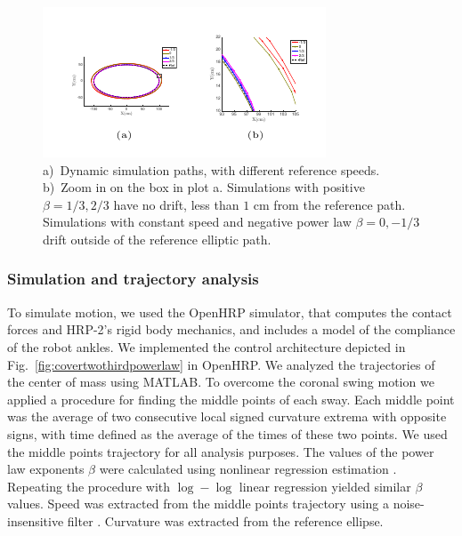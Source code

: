 \begin{figure}
	\centering
	\includegraphics[trim=0cm 0.4cm 0cm 0.5cm,width=\linewidth]{./figures/dynamic_simulation.pdf}
	\caption{a)~Dynamic simulation paths, with different reference speeds. b)~Zoom in on the box in plot a. Simulations with positive $\beta = 1/3,2/3$ have no drift, less than $1$ cm from the reference path. Simulations with constant speed and negative power law $\beta = 0, -1/3$ drift outside of the reference elliptic path.}
	\label{fig:5ab}
\end{figure}


\subsubsection{Simulation and trajectory analysis}

To simulate motion, we used the OpenHRP simulator, that computes the contact forces and HRP-2's rigid body mechanics, and includes a model of the compliance of the robot ankles. We implemented the control architecture depicted in Fig.~\ref{fig:covertwothirdpowerlaw} in OpenHRP.
We analyzed the trajectories of the center of mass using MATLAB. To overcome the coronal swing motion we applied a procedure for finding the middle points of each sway. Each middle point was the average of two consecutive local signed curvature extrema with opposite signs, with time defined as the average of the times of these two points. We used the middle points trajectory for all analysis purposes. The values of the power law exponents $\beta$ were calculated using nonlinear regression estimation  \cite{maoz_noise_2005}. Repeating the procedure with $\log-\log$ linear regression yielded similar $\beta$ values. Speed was extracted from the middle points trajectory using a noise-insensitive filter \cite{Holobororodko2008}. Curvature was extracted from the reference ellipse.

